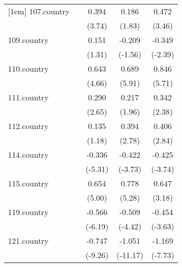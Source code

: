 {\begin{tabular}{l*{4}{c}}
[1em]
107.country &                     &       0.394\sym{***}&       0.186         &       0.472\sym{***}\\
            &                     &      (3.74)         &      (1.83)         &      (3.46)         \\
[1em]
109.country &                     &       0.151         &      -0.209         &      -0.349\sym{*}  \\
            &                     &      (1.31)         &     (-1.56)         &     (-2.39)         \\
[1em]
110.country &                     &       0.643\sym{***}&       0.689\sym{***}&       0.846\sym{***}\\
            &                     &      (4.66)         &      (5.91)         &      (5.71)         \\
[1em]
111.country &                     &       0.290\sym{**} &       0.217\sym{*}  &       0.342\sym{*}  \\
            &                     &      (2.65)         &      (1.96)         &      (2.38)         \\
[1em]
112.country &                     &       0.135         &       0.394\sym{**} &       0.406\sym{**} \\
            &                     &      (1.18)         &      (2.78)         &      (2.84)         \\
[1em]
114.country &                     &      -0.336\sym{***}&      -0.422\sym{***}&      -0.425\sym{***}\\
            &                     &     (-5.31)         &     (-3.73)         &     (-3.74)         \\
[1em]
115.country &                     &       0.654\sym{***}&       0.778\sym{***}&       0.647\sym{**} \\
            &                     &      (5.00)         &      (5.28)         &      (3.18)         \\
[1em]
119.country &                     &      -0.566\sym{***}&      -0.509\sym{***}&      -0.454\sym{***}\\
            &                     &     (-6.19)         &     (-4.42)         &     (-3.63)         \\
[1em]
121.country &                     &      -0.747\sym{***}&      -1.051\sym{***}&      -1.169\sym{***}\\
            &                     &     (-9.26)         &    (-11.17)         &     (-7.73)         \\

\end{tabular}}
